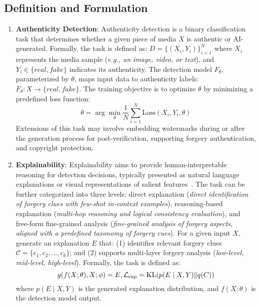 \subsection{Definition and Formulation}
\begin{enumerate}
    \item \textbf{Authenticity Detection}:
    Authenticity detection is a binary classification task that determines whether a given piece of media $X$ is authentic or AI-generated. Formally, the task is defined as:
$D = \{(X_i, Y_i)\}_{i=1}^N$
where $X_i$ represents the media sample (\textit{e.g., an image, video, or text}), and $Y_i\in \{real, fake\}$ indicates its authenticity. The detection model $F_\theta$, parameterized by $\theta$, maps input data to authenticity labels:
$F_\theta : X \rightarrow \{real, fake\}$.
The training objective is to optimize $\theta$ by minimizing a predefined loss function:
    \begin{equation}\label{eqn-1}
    \theta = \arg \min_{\theta} \frac{1}{N} \sum_{i=1}^{N} \text{Loss}(X_i, Y_i, \theta)
    \end{equation}
Extensions of this task may involve embedding watermarks during or after the generation process for post-verification, supporting forgery authentication, and copyright protection.


    \item \textbf{Explainability}:
    Explainability aims to provide human-interpretable reasoning for detection decisions, typically presented as natural language explanations or visual representations of salient features~\cite{dang2024explainable, zhao2024explainability}. The task can be further categorized into three levels: direct explanation (\textit{direct identification of forgery clues with few-shot in-context examples}), reasoning-based explanation (\textit{multi-hop reasoning and logical consistency evaluation}), and free-form fine-grained analysis (\textit{fine-grained analysis of forgery aspects, aligned with a predefined taxonomy of forgery cues}). For a given input $X$, generate an explanation $E$ that: (1) identifies relevant forgery clues $\mathcal{C} = \{c_1, c_2, \dots, c_k\}$; and (2) supports multi-layer forgery analysis (\textit{low-level, mid-level, high-level}). Formally, the task is defined as: 
    \begin{equation}\label{eqn-2}
    g(f(X; \theta), X; \phi) = E, \\
    \mathcal{L}_{\text{exp}} = \text{KL}(p(E \mid X, Y) \| q(C))
    \end{equation}
    where $p(E \mid X, Y)$ is the generated explanation distribution, and $f(X; \theta)$ is the detection model output.
   


\end{enumerate}
